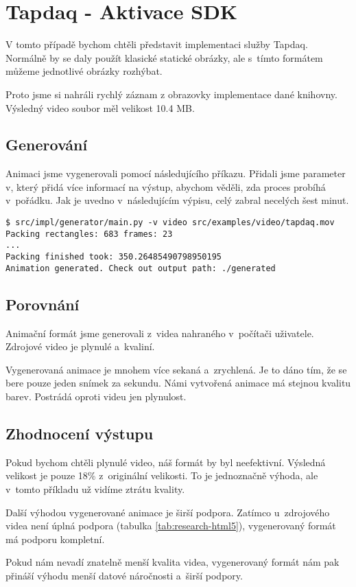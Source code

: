 \newpage
\section{Tapdaq  - Aktivace SDK}

V tomto případě bychom chtěli představit implementaci služby Tapdaq. Normálně by se daly použít klasické statické obrázky, ale s~tímto formátem můžeme jednotlivé obrázky rozhýbat.

Proto jsme si nahráli rychlý záznam z obrazovky implementace dané knihovny. Výsledný video soubor měl velikost 10.4 MB. 

\subsection{Generování}

Animaci jsme vygenerovali pomocí následujícího příkazu. Přidali jsme parameter v, který přidá více informací na výstup, abychom věděli, zda proces probíhá v~pořádku. Jak je uvedno v~následujícím výpisu, celý zabral necelých šest minut.

\begin{lstlisting}
$ src/impl/generator/main.py -v video src/examples/video/tapdaq.mov
Packing rectangles: 683 frames: 23
...
Packing finished took: 350.26485490798950195
Animation generated. Check out output path: ./generated
\end{lstlisting}

\subsection{Porovnání}

Animační formát jsme generovali z~videa nahraného v~počítači uživatele. Zdrojové video je plynulé a~kvaliní.

Vygenerovaná animace je mnohem více sekaná a~zrychlená. Je to dáno tím, že se bere pouze jeden snímek za sekundu. Námi vytvořená animace má stejnou kvalitu barev. Postrádá oproti videu jen plynulost.

\subsection{Zhodnocení výstupu}

Pokud bychom chtěli plynulé video, náš formát by byl neefektivní. Výsledná velikost je pouze 18\% z~originální velikosti. To je jednoznačně výhoda, ale v~tomto příkladu už vidíme ztrátu kvality. 

Další výhodou vygenerované animace je širší podpora. Zatímco u~zdrojového videa není úplná podpora (tabulka \ref{tab:research-html5}), vygenerovaný formát má podporu kompletní. 

Pokud nám nevadí znatelně menší kvalita videa, vygenerovaný formát nám pak přináší výhodu menší datové náročnosti a~širší podpory.

\newpage

